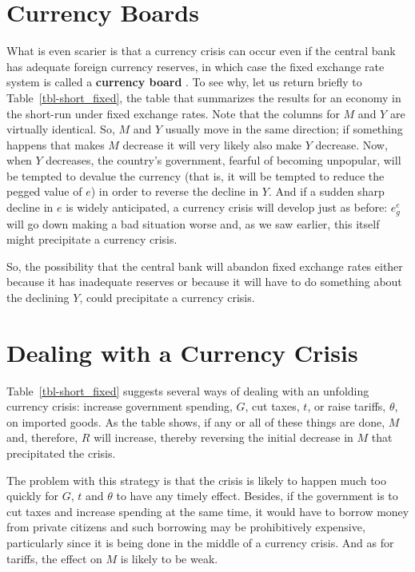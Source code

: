 \documentclass[
  letterpaper,
]{book}
\theoremstyle{plain}
\theoremstyle{remark}
\begin{document}
\section{Currency Boards}\label{sec-currboard}

What is even scarier is that a currency crisis can occur even if the
central bank has adequate foreign currency reserves, in which case the
fixed exchange rate system is called a \textbf{currency board}
. To see why, let us return briefly to
Table~\ref{tbl-short_fixed}, the table that summarizes the results for
an economy in the short-run under fixed exchange rates. Note that the
columns for \(M\) and \(Y\) are virtually identical. So, \(M\) and \(Y\)
usually move in the same direction; if something happens that makes
\(M\) decrease it will very likely also make \(Y\) decrease. Now, when
\(Y\) decreases, the country's government, fearful of becoming
unpopular, will be tempted to devalue the currency (that is, it will be
tempted to reduce the pegged value of \(e\)) in order to reverse the
decline in \(Y\). And if a sudden sharp decline in \(e\) is widely
anticipated, a currency crisis will develop just as before: \(e_g^e\)
will go down making a bad situation worse and, as we saw earlier, this
itself might precipitate a currency crisis.

So, the possibility that the central bank will abandon fixed exchange
rates either because it has inadequate reserves or because it will have
to do something about the declining \(Y\), could precipitate a currency
crisis.

\section{Dealing with a Currency Crisis}\label{sec-cure}

Table~\ref{tbl-short_fixed} suggests several ways of dealing with an
unfolding currency crisis: increase government spending, \(G\), cut
taxes, \(t\), or raise tariffs, \(\theta\), on imported goods. As the
table shows, if any or all of these things are done, \(M\) and,
therefore, \(R\) will increase, thereby reversing the initial decrease
in \(M\) that precipitated the crisis.

The problem with this strategy is that the crisis is likely to happen
much too quickly for \(G\), \(t\) and \(\theta\) to have any timely
effect. Besides, if the government is to cut taxes and increase spending
at the same time, it would have to borrow money from private citizens
and such borrowing may be prohibitively expensive, particularly since it
is being done in the middle of a currency crisis. And as for tariffs,
the effect on \(M\) is likely to be weak.
\end{document}

